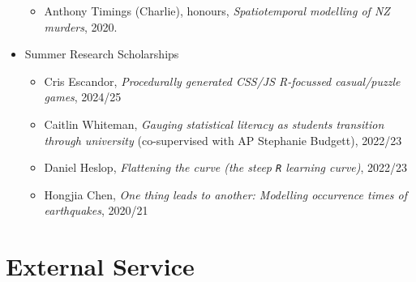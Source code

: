 \documentclass[10pt,a4paper]{moderncv}
\begin{document}
\begin{itemize}
\begin{itemize}
  \item Anthony Timings (Charlie), honours, \textit{Spatiotemporal modelling of NZ murders}, 2020.
  \end{itemize}
\item Summer Research Scholarships
  \begin{itemize}
  \item Cris Escandor, \textit{Procedurally generated CSS/JS R-focussed casual/puzzle games}, 2024/25
  \item Caitlin Whiteman, \textit{Gauging statistical literacy as students transition through university} (co-supervised with AP Stephanie Budgett), 2022/23
  \item Daniel Heslop, \textit{Flattening the curve (the steep \texttt{R} learning curve)}, 2022/23
  \item Hongjia Chen, \textit{One thing leads to another: Modelling occurrence times of earthquakes}, 2020/21
  \end{itemize}
\end{itemize}


\section{External Service}
\vspace{6pt}
\end{document}
